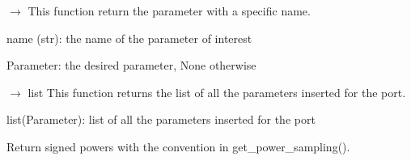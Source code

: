 \documentclass[letterpaper,10pt,english]{sphinxmanual}
\begin{document}
\begin{fulllineitems}
\begin{fulllineitems}
\begin{description}
\end{description}

\end{fulllineitems}


\begin{fulllineitems}
\label{\detokenize{scrimp:scrimp.port.Port.get_parameter}}
\pysigstartsignatures
\pysiglinewithargsret
{}
{}
{{ $\rightarrow$ {\hyperref[\detokenize{scrimp:scrimp.port.Parameter}]{}}}}
\pysigstopsignatures
\sphinxAtStartPar
This function return the parameter with a specific name.
\begin{description}
\sphinxAtStartPar
name (str): the name of the parameter of interest

\sphinxAtStartPar
Parameter: the desired parameter, None otherwise

\end{description}

\end{fulllineitems}


\begin{fulllineitems}
\label{\detokenize{scrimp:scrimp.port.Port.get_parameters}}
\pysigstartsignatures
\pysiglinewithargsret
{}
{}
{{ $\rightarrow$ list}}
\pysigstopsignatures
\sphinxAtStartPar
This function returns the list of all the parameters inserted for the port.
\begin{description}
\sphinxAtStartPar
list(Parameter): list of all the parameters inserted for the port

\end{description}

\end{fulllineitems}


\begin{fulllineitems}
\label{\detokenize{scrimp:scrimp.port.Port.get_power}}
\pysigstartsignatures
\pysiglinewithargsret
{}
{}
{}
\pysigstopsignatures
\sphinxAtStartPar
Return signed powers with the convention in get\_power\_sampling().


\end{fulllineitems}
\end{fulllineitems}
\end{document}
